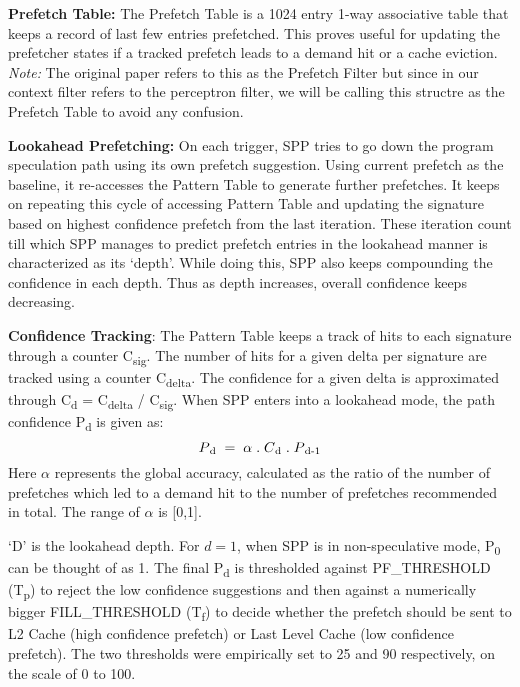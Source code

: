 \textbf{Prefetch Table:} The Prefetch Table is a 1024 entry 1-way associative table that
keeps a record of last few entries prefetched.  This proves useful for
updating the prefetcher states if a tracked prefetch leads to a demand hit or
a cache eviction. \textit{Note:} The original paper refers to this as the Prefetch Filter 
but since in our context filter refers to the perceptron filter, we will be calling 
this structre as the Prefetch Table to avoid any confusion.

\textbf{Lookahead Prefetching:} On each trigger, SPP tries to go down
the program speculation path using its own prefetch suggestion.
Using current prefetch as the baseline, it re-accesses the Pattern Table to generate further
prefetches.  It keeps on repeating this cycle of accessing Pattern Table and
updating the signature based on highest confidence prefetch from the
last iteration.  These iteration count till which SPP manages to
predict prefetch entries in the lookahead manner is characterized as
its `depth'.  While doing this, SPP also keeps compounding the
confidence in each depth.  Thus as depth increases, overall confidence
keeps decreasing.  

\textbf{Confidence Tracking}: The Pattern Table keeps a track of hits to each
signature through a counter C\textsubscript{sig}.  The number of hits
for a given delta per signature are tracked using a counter
C\textsubscript{delta}.  The confidence for a given delta is
approximated through C\textsubscript{d} = C\textsubscript{delta} /
C\textsubscript{sig}.  When SPP enters into a lookahead mode, the path
confidence P\textsubscript{d} is given as:
$$P\textsubscript{d} \;=\; \alpha  \;.\;  C\textsubscript{d}  \;.\;  P\textsubscript{d-1}$$ 
Here $\alpha$ represents the global accuracy, calculated as the ratio of 
the number of prefetches which led to a demand hit to the number of 
prefetches recommended in total. The range of $\alpha$ is [0,1].

`D' is the lookahead depth. For $d = 1$, when SPP is in
non-speculative mode, P\textsubscript{0} can be thought of as 1. 
The final P\textsubscript{d} is thresholded against PF\_THRESHOLD 
(T\textsubscript{p}) to reject the low confidence suggestions and 
then against a numerically bigger FILL\_THRESHOLD (T\textsubscript{f}) to 
decide whether the prefetch should be sent to L2 Cache 
(high confidence prefetch) or Last Level Cache (low confidence prefetch).
The two thresholds were empirically set to 25 and 90 respectively, 
on the scale of 0 to 100.  

